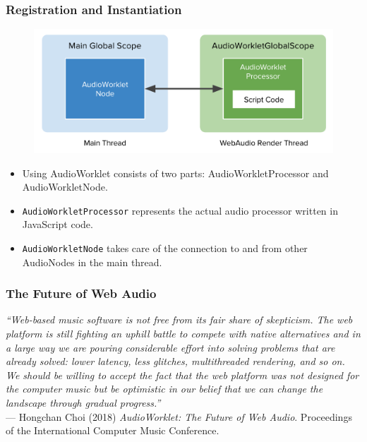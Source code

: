 \documentclass[screen, aspectratio=43]{beamer}
\begin{document}
\begin{frame}
\frametitle{Registration and Instantiation}
   \begin{figure}
	\includegraphics[scale=0.3]{img/webaudio-1.pdf}
   \end{figure}
\begin{itemize}
\item Using AudioWorklet consists of two parts: AudioWorkletProcessor and AudioWorkletNode. 
\item \texttt{AudioWorkletProcessor} represents the actual audio processor written in JavaScript code.
\item \texttt{AudioWorkletNode} takes care of the connection to and from other AudioNodes in the main thread. 
\end{itemize}
\vspace{2 mm}
\end{frame}
%
\begin{frame}
\frametitle{The Future of Web Audio}
\textit{\scriptsize{``Web-based music software is not free from its fair share of skepticism. The web platform is still fighting an uphill battle to compete with native alternatives and in a large way we are pouring considerable effort into solving problems that are already solved: lower latency, less glitches, multithreaded rendering, and so on. We should be willing to accept the fact that the web platform was not designed for the computer music but be optimistic in our belief that we can change the landscape through gradual progress.''}}\\
\vspace{10 mm}
\tiny{--- Hongchan Choi (2018) \textit{AudioWorklet: The Future of Web Audio}. Proceedings of the International Computer Music Conference.}
\end{frame}
\end{document}
